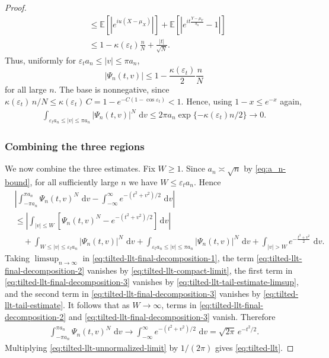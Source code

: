 \documentclass[11pt]{article}
\numberwithin{equation}{section}
\newcommand{\dd}{\,\mathrm{d}}
\newcommand{\ex}[1]{\ensuremath{\mathbb{E}\left[ #1\right]}}
\begin{document}
\begin{proof}
\begin{align*}
    & \le \ex{\left|e^{iu(X-\mu_X)}\right|} + \ex{\left|e^{it \frac{Y-\mu_Y}{b_n}}-1\right|} \\
    & \le 1-\kappa(\varepsilon_t)\frac{n}{N} + \frac{|t|}{\sqrt N}.
\end{align*}
Thus, uniformly for
$\varepsilon_t a_n \le |v|\le \pi a_n$,
\[
|\Psi_n(t,v)|
\le 1-\frac{\kappa(\varepsilon_t)}{2}\frac{n}{N}
\]
for all large $n$. The base is nonnegative, since $\kappa(\varepsilon_t)\, n/N \le \kappa(\varepsilon_t)\, C = 1-e^{-C(1-\cos\varepsilon_t)} < 1$. Hence, using $1-x\le e^{-x}$ again,
\begin{align}
    \label{eq:tilted-llt-tail-estimate}
\int_{\varepsilon_t a_n\le |v|\le \pi a_n}
|\Psi_n(t,v)|^N\,\dd v
\le 2\pi a_n\exp\{-\kappa(\varepsilon_t) n/2\}
\longrightarrow 0.
\end{align}

\subsubsection*{Combining the three regions}
We now combine the three estimates. Fix $W\ge 1$. Since $a_n \asymp \sqrt{n}$ by \eqref{eq:a_n-bound}, for all sufficiently large $n$ we have $W \le \varepsilon_t a_n$. Hence
\begin{align}
\label{eq:tilted-llt-final-decomposition-1}
&\left|
\int_{-\pi a_n}^{\pi a_n}\Psi_n(t,v)^N\,\dd v
-
\int_{-\infty}^{\infty}e^{-(t^2+v^2)/2}\,\dd v
\right| \\
\label{eq:tilted-llt-final-decomposition-2}
&\le
\left|
\int_{|v|\le W}
\left[\Psi_n(t,v)^N-e^{-(t^2+v^2)/2}\right] \dd v
\right| \\
\label{eq:tilted-llt-final-decomposition-3}
&\quad+
\int_{W \le |v|\le \varepsilon_t a_n}|\Psi_n(t,v)|^N\,\dd v
+
\int_{\varepsilon_t a_n\le |v|\le \pi a_n}|\Psi_n(t,v)|^N\,\dd v
+
\int_{|v|>W}e^{-\frac{t^2+v^2}{2}}\,\dd v .
\end{align}
Taking $\limsup_{n\to\infty}$ in \eqref{eq:tilted-llt-final-decomposition-1}, the term \eqref{eq:tilted-llt-final-decomposition-2} vanishes by \eqref{eq:tilted-llt-compact-limit}, the first term in \eqref{eq:tilted-llt-final-decomposition-3} vanishes by \eqref{eq:tilted-llt-tail-estimate-limsup}, and the second term in \eqref{eq:tilted-llt-final-decomposition-3} vanishes by \eqref{eq:tilted-llt-tail-estimate}. 
It follows that as $W\to\infty$, terms in \eqref{eq:tilted-llt-final-decomposition-2} and \eqref{eq:tilted-llt-final-decomposition-3} vanish. Therefore
\begin{align}
\label{eq:tilted-llt-unnormalized-limit}
\int_{-\pi a_n}^{\pi a_n}\Psi_n(t,v)^N\,\dd v
\longrightarrow
\int_{-\infty}^{\infty}e^{-(t^2+v^2)/2}\,\dd v
=\sqrt{2\pi}\,e^{-t^2/2}.
\end{align}
Multiplying \eqref{eq:tilted-llt-unnormalized-limit} by $1/(2\pi)$ gives \eqref{eq:tilted-llt}.
\end{proof}
\end{document}
